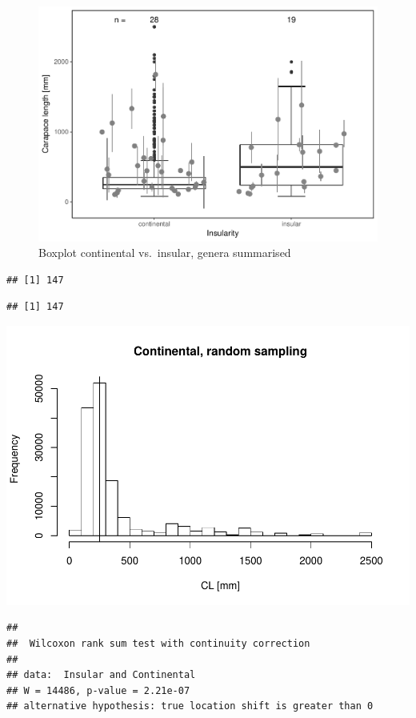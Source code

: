 \documentclass[]{article}
\begin{document}
\begin{figure}[htbp]
\centering
\includegraphics{MA_JJ_files/figure-latex/BPCI-1.pdf}
\caption{Boxplot continental vs.~insular, genera summarised}
\end{figure}

\begin{verbatim}
## [1] 147
\end{verbatim}

\begin{verbatim}
## [1] 147
\end{verbatim}

\includegraphics{MA_JJ_files/figure-latex/RSCI-1.pdf}

\begin{verbatim}
## 
##  Wilcoxon rank sum test with continuity correction
## 
## data:  Insular and Continental
## W = 14486, p-value = 2.21e-07
## alternative hypothesis: true location shift is greater than 0
\end{verbatim}
\end{document}
